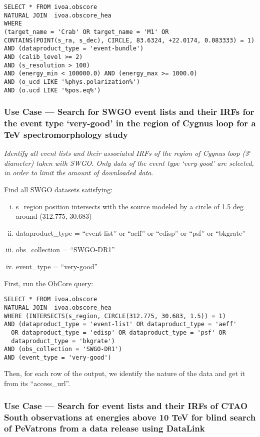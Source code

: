\begin{verbatim}
SELECT * FROM ivoa.obscore
NATURAL JOIN  ivoa.obscore_hea
WHERE
(target_name = 'Crab' OR target_name = 'M1' OR
CONTAINS(POINT(s_ra, s_dec), CIRCLE, 83.6324, +22.0174, 0.083333) = 1)
AND (dataproduct_type = 'event-bundle')
AND (calib_level >= 2)
AND (s_resolution > 100)
AND (energy_min < 100000.0) AND (energy_max >= 1000.0)
AND (o_ucd LIKE '%phys.polarization%')
AND (o.ucd LIKE '%pos.eq%')
\end{verbatim}

\subsubsection{Use Case ---  Search for SWGO event lists and their \glspl{IRF} for the event type `very-good' in the region of Cygnus loop for a TeV spectromorphology study}

{\em Identify all event lists and their associated \glspl{IRF} of the region of Cygnus loop (3$^{\circ}$ diameter) taken with SWGO. Only data of the event type `very-good' are selected, in order to limit the amount of downloaded data.\/}

\medskip
\noindent Find all SWGO datasets satisfying:
\begin{enumerate}[(i)]
  \item s\_region position intersects with the source modeled by a circle of 1.5 deg around (312.775, 30.683)
  \item dataproduct\_type = ``event-list'' or ``aeff'' or ``edisp'' or ``psf'' or ``bkgrate''
  \item obs\_collection = ``SWGO-DR1''
  \item event\_type = ``very-good''
\end{enumerate}

First, run the ObCore query:
\begin{verbatim}
SELECT * FROM ivoa.obscore
NATURAL JOIN  ivoa.obscore_hea
WHERE (INTERSECTS(s_region, CIRCLE(312.775, 30.683, 1.5)) = 1)
AND (dataproduct_type = 'event-list' OR dataproduct_type = 'aeff' 
  OR dataproduct_type = 'edisp' OR dataproduct_type = 'psf' OR
  dataproduct_type = 'bkgrate')
AND (obs_collection = 'SWGO-DR1')
AND (event_type = 'very-good')
\end{verbatim}

Then, for each row of the output, we identify the nature of the data and get it from its ``access\_url''.

\subsubsection{Use Case --- Search for event lists and their \glspl{IRF} of CTAO South observations at energies above 10 TeV for blind search of PeVatrons from a data release using DataLink}

